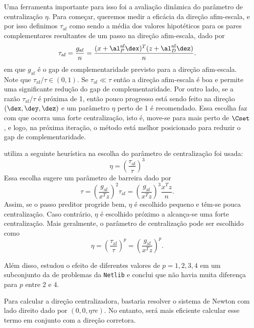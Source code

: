 Uma ferramenta importante para isso foi a avaliação dinâmica do parâmetro de
centralização $\eta$. Para começar, queremos medir a eficácia da direção
afim-escala, e por isso definimos $\tau_{\text{af}}$ como sendo a média dos valores
hipotéticos para os pares complementares resultantes de um passo na direção
afim-escala, dado por 
\begin{equation}
\label{eq:tau-affine}
 \tau_{\text{af}} = \frac{g_{\text{af}}}{n} = \frac{(x+\al_P^{\text{af}}\dex)^T
(z+\al_D^{\text{af}}\dez)}{n}.
\end{equation}
em que $g_{\text{af}}$ é o gap de complementaridade previsto para a direção afim-escala.
Note que $\tau_{\text{af}}/\tau\in(0,1)$. Se $\tau_{\text{af}}\ll\tau$ então a direção afim-escala é
boa e permite uma significante redução do gap de complementaridade. Por outro
lado, se a razão $\tau_{\text{af}}/\tau$ é próxima de 1, então pouco progresso está sendo
feito na direção  $(\dex, \dey, \dez)$ e um parâmetro $\eta$ perto de 1 é
recomendado. Essa escolha faz com que ocorra uma forte centralização, isto é,
move-se para mais perto de $\Cset$, e logo, na próxima iteração, o método está
melhor posicionado para reduzir o gap de complementaridade.

 \citet{Mehrotra:1992wr} utiliza a seguinte heurística na escolha do parâmetro
 de centralização foi usada:
\begin{equation}\label{eq:Mehrotra-centralizer-parameter}
\eta = \left(\frac{\tau_{\text{af}}}{\tau}\right)^3
\end{equation}
Essa escolha sugere um parâmetro de barreira dado por 
\begin{equation}\label{eq:Mehrotra-barrier-parameter}
\tau = \left(\frac{g_{\text{af}}}{x^Tz}\right)^2\tau_{\text{af}} =
\left(\frac{g_{\text{af}}}{x^Tz}\right)^3\frac{x^Tz}{n}.
\end{equation}
Assim, se o passo preditor progride bem, $\eta$ é escolhido pequeno e têm-se
pouca centralização. Caso contrário, $\eta$ é escolhido próximo a alcança-se
uma forte centralização. Mais geralmente, o parâmetro de
centralização pode ser escolhido como
\[
\eta = \left(\frac{\tau_{\text{af}}}{\tau}\right)^p = \left(\frac{g_{\text{af}}}{x^Tz}\right)^p.
\]

Além disso, \citet{Mehrotra:1992wr} estudou o efeito de diferentes valores de
$p= 1,2,3,4$ em um subconjunto da de problemas da \texttt{Netlib} e conclui que não havia
 muita diferença para $p$ entre 2 e 4.

Para calcular a direção centralizadora, bastaria resolver o sistema de Newton
com lado direito dado por $(0,0,\eta \tau e)$. No entanto, será mais eficiente
calcular esse termo em conjunto com a direção corretora. 

